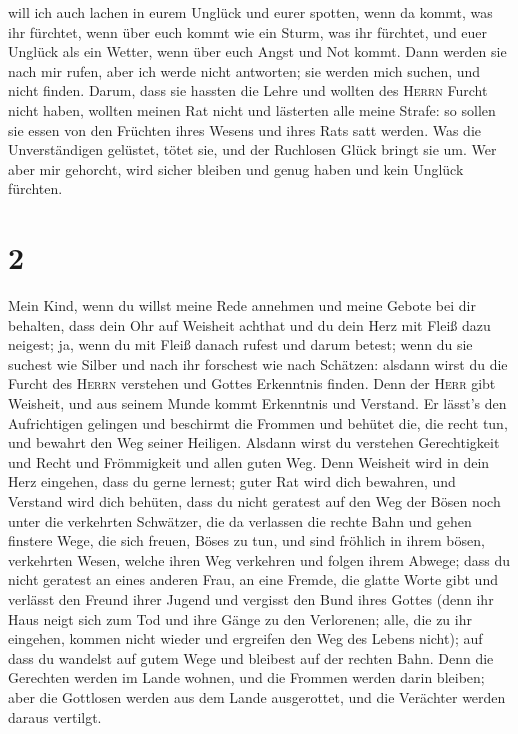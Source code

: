 will ich auch lachen in eurem Unglück und eurer spotten, wenn da kommt,
was ihr fürchtet,  wenn über euch kommt wie ein Sturm,
was ihr fürchtet, und euer Unglück als ein Wetter, wenn über euch Angst
und Not kommt.  Dann werden sie nach mir rufen, aber ich
werde nicht antworten; sie werden mich suchen, und nicht finden.
 Darum, dass sie hassten die Lehre und wollten des
\textsc{Herrn} Furcht nicht haben,  wollten meinen Rat
nicht und lästerten alle meine Strafe:  so sollen sie
essen von den Früchten ihres Wesens und ihres Rats satt werden.
 Was die Unverständigen gelüstet, tötet sie, und der
Ruchlosen Glück bringt sie um.  Wer aber mir gehorcht,
wird sicher bleiben und genug haben und kein Unglück fürchten.

\hypertarget{section-1}{%
\section{2}\label{section-1}}

 Mein Kind, wenn du willst meine Rede annehmen und meine
Gebote bei dir behalten,  dass dein Ohr auf Weisheit
achthat und du dein Herz mit Fleiß dazu neigest;  ja, wenn
du mit Fleiß danach rufest und darum betest;  wenn du sie
suchest wie Silber und nach ihr forschest wie nach Schätzen:
 alsdann wirst du die Furcht des \textsc{Herrn} verstehen
und Gottes Erkenntnis finden.  Denn der \textsc{Herr} gibt
Weisheit, und aus seinem Munde kommt Erkenntnis und Verstand.
 Er lässt's den Aufrichtigen gelingen und beschirmt die
Frommen  und behütet die, die recht tun, und bewahrt den
Weg seiner Heiligen.  Alsdann wirst du verstehen
Gerechtigkeit und Recht und Frömmigkeit und allen guten Weg.
 Denn Weisheit wird in dein Herz eingehen, dass du gerne
lernest;  guter Rat wird dich bewahren, und Verstand wird
dich behüten,  dass du nicht geratest auf den Weg der
Bösen noch unter die verkehrten Schwätzer,  die da
verlassen die rechte Bahn und gehen finstere Wege,  die
sich freuen, Böses zu tun, und sind fröhlich in ihrem bösen, verkehrten
Wesen,  welche ihren Weg verkehren und folgen ihrem
Abwege;  dass du nicht geratest an eines anderen Frau, an
eine Fremde, die glatte Worte gibt  und verlässt den
Freund ihrer Jugend und vergisst den Bund ihres Gottes 
(denn ihr Haus neigt sich zum Tod und ihre Gänge zu den Verlorenen;
 alle, die zu ihr eingehen, kommen nicht wieder und
ergreifen den Weg des Lebens nicht);  auf dass du
wandelst auf gutem Wege und bleibest auf der rechten Bahn.
 Denn die Gerechten werden im Lande wohnen, und die
Frommen werden darin bleiben;  aber die Gottlosen werden
aus dem Lande ausgerottet, und die Verächter werden daraus vertilgt.

